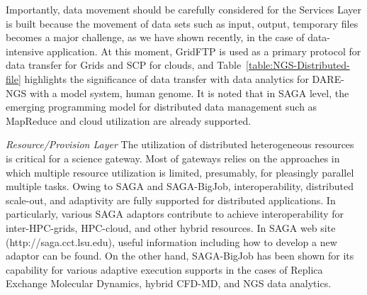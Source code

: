 \documentclass{sig-alternate}
\begin{document}
Importantly, data movement should be carefully considered for the Services Layer is built because the movement of data sets such as input, output, temporary files becomes a major challenge, as we have shown recently, in the case of data-intensive application\cite{ecmls11}. At this moment, GridFTP is used as a primary protocol for data transfer for Grids and SCP for clouds, and Table~\ref{table:NGS-Distributed-file} highlights the significance of data transfer with data analytics for DARE-NGS with a model system, human genome.  It is noted that in SAGA level, the emerging programming model for distributed data management such as MapReduce and cloud utilization are already supported\cite{abstractions-azure,saga-ccgrid10}.

%

\textit{Resource/Provision Layer}
The utilization of distributed heterogeneous resources is critical for a science gateway.  Most of gateways relies on the approaches in which multiple resource utilization is limited, presumably, for pleasingly parallel multiple tasks.  Owing to SAGA and SAGA-BigJob, interoperability, distributed scale-out, and adaptivity are fully supported for distributed applications.  In particularly, various SAGA adaptors contribute to achieve interoperability for inter-HPC-grids, HPC-cloud, and other hybrid resources.  In SAGA web site (http://saga.cct.lsu.edu), useful information including how to develop a new adaptor can be found.  On the other hand, SAGA-BigJob has been shown for its capability for various adaptive execution supports in the cases of Replica Exchange Molecular Dynamics, hybrid CFD-MD, and NGS data analytics\cite{saga-royalsoc,coupled,ecmls11}.    
\end{document}
